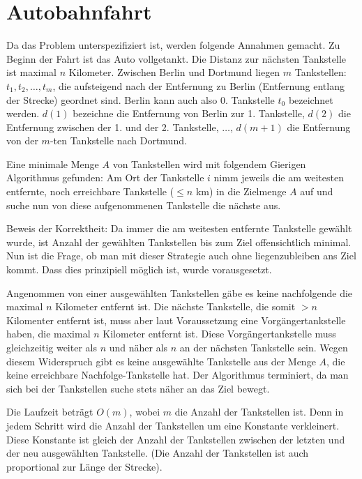 \documentclass[a4paper,10pt]{scrartcl}
\begin{document}
\section{Autobahnfahrt}
Da das Problem unterspezifiziert ist, werden folgende Annahmen gemacht. Zu Beginn der Fahrt ist das Auto vollgetankt. Die Distanz zur nächsten Tankstelle ist maximal $n$ Kilometer.
Zwischen Berlin und Dortmund liegen $m$ Tankstellen: $t_1, t_2, \hdots, t_m$, die aufsteigend nach der Entfernung zu Berlin (Entfernung entlang der Strecke) geordnet sind. Berlin kann auch also 0.
Tankstelle $t_0$ bezeichnet werden.
$d(1)$ bezeichne die Entfernung von Berlin zur 1. Tankstelle, $d(2)$ die Entfernung zwischen der 1. und der 2. Tankstelle, $\hdots$, $d(m + 1)$ die Entfernung von der $m$-ten Tankstelle nach Dortmund.

Eine minimale Menge $A$ von Tankstellen wird mit folgendem Gierigen Algorithmus gefunden:
Am Ort der Tankstelle $i$ nimm jeweils die am weitesten entfernte, noch erreichbare Tankstelle ($\le n$ km) in die Zielmenge $A$ auf und suche nun von diese aufgenommenen Tankstelle die nächste aus.

Beweis der Korrektheit:
Da immer die am weitesten entfernte Tankstelle gewählt wurde, ist Anzahl der gewählten Tankstellen bis zum Ziel offensichtlich minimal.
Nun ist die Frage, ob man mit dieser Strategie auch ohne liegenzubleiben ans Ziel kommt. Dass dies prinzipiell möglich ist, wurde vorausgesetzt.

Angenommen von einer ausgewählten Tankstellen gäbe es keine nachfolgende die maximal $n$ Kilometer entfernt ist. Die nächste Tankstelle, die somit $> n$ Kilomenter entfernt ist, muss aber laut Voraussetzung eine
Vorgängertankstelle haben, die maximal $n$ Kilometer entfernt ist. Diese Vorgängertankstelle muss gleichzeitig weiter als $n$ und näher als $n$ an der nächsten Tankstelle sein. Wegen diesem Widerspruch
gibt es keine ausgewählte Tankstelle aus der Menge $A$, die keine erreichbare Nachfolge-Tankstelle hat.
Der Algorithmus terminiert, da man sich bei der Tankstellen suche stets näher an das Ziel bewegt.


Die Laufzeit beträgt $O(m)$, wobei $m$ die Anzahl der Tankstellen ist. Denn in jedem Schritt wird die Anzahl der Tankstellen um eine Konstante verkleinert. Diese Konstante ist gleich der Anzahl der Tankstellen
zwischen der letzten und der neu ausgewählten Tankstelle. (Die Anzahl der Tankstellen ist auch proportional zur Länge der Strecke).
\end{document}
